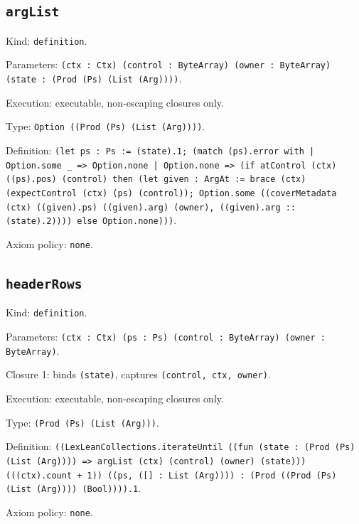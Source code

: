 \documentclass[11pt]{article}
\begin{document}
\subsection*{\texttt{argList}}
\noindent Kind: \texttt{definition}.\par
\noindent Parameters: \texttt{(ctx : Ctx) (control : ByteArray) (owner : ByteArray) (state : (Prod (Ps) (List (Arg))))}.\par
\noindent Execution: executable, non-escaping closures only.\par
\noindent Type: \texttt{Option ((Prod (Ps) (List (Arg))))}.\par
\noindent Definition: \texttt{(let ps : Ps := (state).1; (match (ps).error with | Option.some \_ => Option.none | Option.none => (if atControl (ctx) ((ps).pos) (control) then (let given : ArgAt := brace (ctx) (expectControl (ctx) (ps) (control)); Option.some ((coverMetadata (ctx) ((given).ps) ((given).arg) (owner), ((given).arg :: (state).2)))) else Option.none)))}.\par
\noindent Axiom policy: \texttt{none}.\par
\subsection*{\texttt{headerRows}}
\noindent Kind: \texttt{definition}.\par
\noindent Parameters: \texttt{(ctx : Ctx) (ps : Ps) (control : ByteArray) (owner : ByteArray)}.\par
\noindent Closure 1: binds \texttt{(state)}, captures \texttt{(control, ctx, owner)}.\par
\noindent Execution: executable, non-escaping closures only.\par
\noindent Type: \texttt{(Prod (Ps) (List (Arg)))}.\par
\noindent Definition: \texttt{((LexLeanCollections.iterateUntil ((fun (state : (Prod (Ps) (List (Arg)))) => argList (ctx) (control) (owner) (state))) (((ctx).count + 1)) ((ps, ([] : List (Arg)))) : (Prod ((Prod (Ps) (List (Arg)))) (Bool)))).1}.\par
\noindent Axiom policy: \texttt{none}.\par
\end{document}
